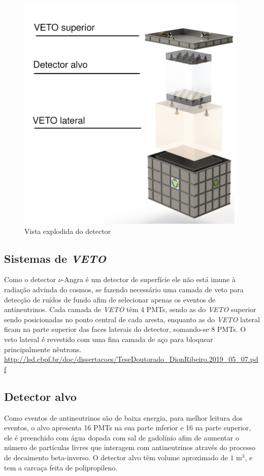 \begin{figure}[H]
    \centering
    \includegraphics[width=11cm]{textuais/experimento/figuras/detector.png}
    \caption{Vista explodida do detector}
    \label{fig:detector}
\end{figure}

\subsection{Sistemas de \emph{VETO}}

Como o detector $\nu$-Angra é um detector de superfície ele não está imune à radiação advinda do cosmos, se fazendo necessário uma camada de veto para detecção de ruídos de fundo afim de selecionar apenas os eventos de antineutrinos. Cada camada de \emph{VETO} têm 4 PMTs, sendo as do \emph{VETO} superior sendo posicionadas no ponto central de cada aresta, enquanto as do \emph{VETO} lateral ficam na parte superior das faces laterais do detector, somando-se 8 PMTs. O veto lateral é revestido com uma fina camada de aço para bloquear principalmente nêutrons. \url{http://lsd.cbpf.br/doc/dissertacoes/TeseDoutorado_DionRibeiro.2019_05_07.pdf}

\subsection{Detector alvo}

Como eventos de antineutrinos são de baixa energia, para melhor leitura dos eventos, o alvo apresenta 16 PMTs na sua parte inferior e 16 na parte superior, ele é preenchido com água dopada com sal de gadolínio afim de aumentar o número de partículas livres que interagem com antineutrinos através do processo de decaimento beta-inverso. O detector alvo têm volume aproximado de $1$ m$^3$, e tem a carcaça feita de polipropileno.

